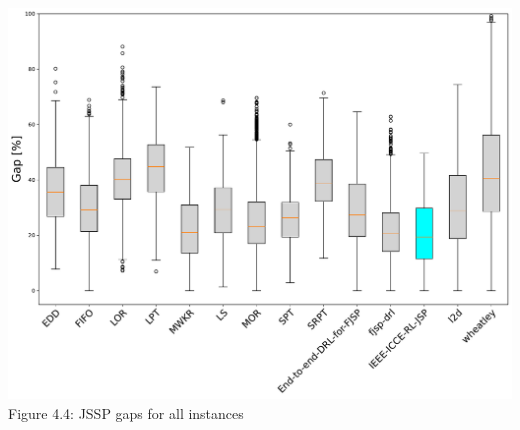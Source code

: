 \begin{center}
    \includegraphics[width=0.9\linewidth]{images/horizontal_boxplot_jssp_all.pdf}\\
    Figure 4.4: JSSP gaps for all instances
\end{center}


